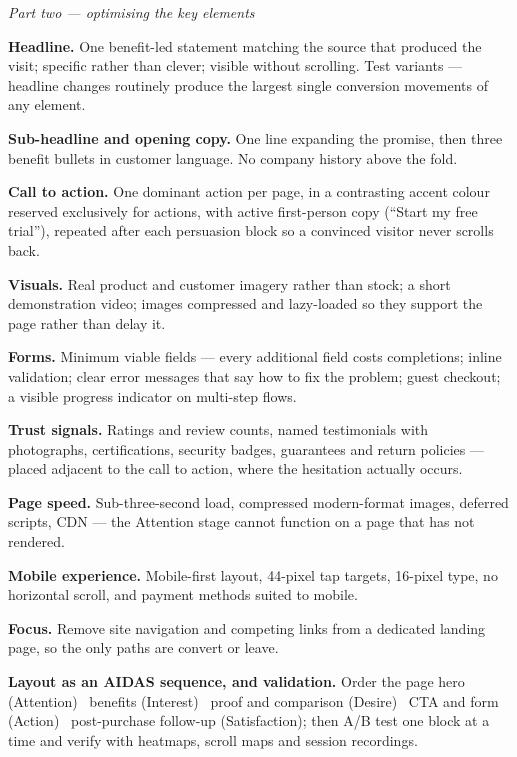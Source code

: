 \begin{qlist}
\textit{Part two --- optimising the key elements}
\begin{apts}
\item \textbf{Headline.} One benefit-led statement matching the source that
      produced the visit; specific rather than clever; visible without
      scrolling. Test variants --- headline changes routinely produce the
      largest single conversion movements of any element.
\item \textbf{Sub-headline and opening copy.} One line expanding the promise,
      then three benefit bullets in customer language. No company history above
      the fold.
\item \textbf{Call to action.} One dominant action per page, in a contrasting
      accent colour reserved exclusively for actions, with active
      first-person copy (``Start my free trial''), repeated after each
      persuasion block so a convinced visitor never scrolls back.
\item \textbf{Visuals.} Real product and customer imagery rather than stock; a
      short demonstration video; images compressed and lazy-loaded so they
      support the page rather than delay it.
\item \textbf{Forms.} Minimum viable fields --- every additional field costs
      completions; inline validation; clear error messages that say how to fix
      the problem; guest checkout; a visible progress indicator on multi-step
      flows.
\item \textbf{Trust signals.} Ratings and review counts, named testimonials with
      photographs, certifications, security badges, guarantees and return
      policies --- placed adjacent to the call to action, where the hesitation
      actually occurs.
\item \textbf{Page speed.} Sub-three-second load, compressed modern-format
      images, deferred scripts, CDN --- the Attention stage cannot function on a
      page that has not rendered.
\item \textbf{Mobile experience.} Mobile-first layout, 44-pixel tap targets,
      16-pixel type, no horizontal scroll, and payment methods suited to mobile.
\item \textbf{Focus.} Remove site navigation and competing links from a
      dedicated landing page, so the only paths are convert or leave.
\item \textbf{Layout as an AIDAS sequence, and validation.} Order the page
      hero (Attention) \ra\ benefits (Interest) \ra\ proof and comparison
      (Desire) \ra\ CTA and form (Action) \ra\ post-purchase follow-up
      (Satisfaction); then A/B test one block at a time and verify with
      heatmaps, scroll maps and session recordings.
\end{apts}


\end{qlist}
